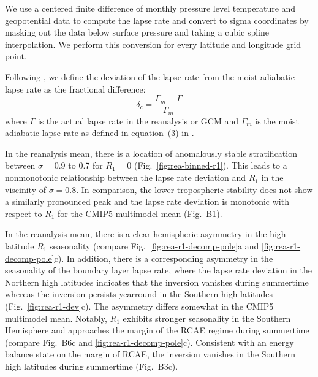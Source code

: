\documentclass{ametsocV5}
\begin{document}
\appendix[A]
We use a centered finite difference of monthly pressure level temperature and geopotential data to compute the lapse rate and convert to sigma coordinates by masking out the data below surface pressure and taking a cubic spline interpolation. We perform this conversion for every latitude and longitude grid point. 

Following \cite{stone1979}, we define the deviation of the lapse rate from the moist adiabatic lapse rate as the fractional difference:
  \begin{equation}
    \delta_{c} = \frac{\Gamma_{m}-\Gamma}{\Gamma_{m}}
  \end{equation}
where $\Gamma$ is the actual lapse rate in the reanalysis or GCM and $\Gamma_m$ is the moist adiabatic lapse rate as defined in equation~(3) in \cite{stone1979}.

\appendix[B]
In the reanalysis mean, there is a location of anomalously stable stratification between $\sigma=0.9$ to 0.7 for $R_1=0$ (Fig.~\ref{fig:rea-binned-r1}). This leads to a nonmonotonic relationship between the lapse rate deviation and $R_1$ in the viscinity of $\sigma=0.8$. In comparison, the lower tropospheric stability does not show a similarly pronounced peak and the lapse rate deviation is monotonic with respect to $R_1$ for the CMIP5 multimodel mean (Fig.~B1).

In the reanalysis mean, there is a clear hemispheric asymmetry in the high latitude $R_1$ seasonality (compare Fig.~\ref{fig:rea-r1-decomp-pole}a and \ref{fig:rea-r1-decomp-pole}c). In addition, there is a corresponding asymmetry in the seasonality of the boundary layer lapse rate, where the lapse rate deviation in the Northern high latitudes indicates that the inversion vanishes during summertime whereas the inversion persists yearround in the Southern high latitudes (Fig.~\ref{fig:rea-r1-dev}c). The asymmetry differs somewhat in the CMIP5 multimodel mean. Notably, $R_1$ exhibits stronger seasonality in the Southern Hemisphere and approaches the margin of the RCAE regime during summertime (compare Fig.~B6c and \ref{fig:rea-r1-decomp-pole}c). Consistent with an energy balance state on the margin of RCAE, the inversion vanishes in the Southern high latitudes during summertime (Fig.~B3c).
\end{document}
